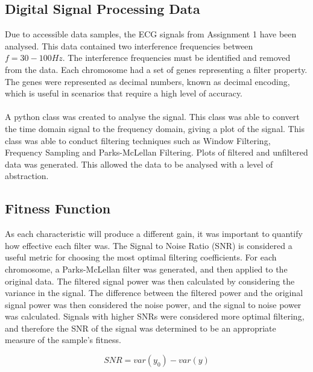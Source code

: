 \documentclass[a4paper, 11pt]{article}
\begin{document}
    \subsection{Digital Signal Processing Data}\label{sec:meth_sub1}
        Due to accessible data samples, the ECG signals from Assignment 1 have been analysed. This data contained
        two interference frequencies between  $f = 30 - 100Hz$. The interference frequencies must be identified and 
        removed from the data. Each chromosome had a set of genes representing a filter property. The genes were 
        represented as decimal numbers, known as decimal encoding, which is useful in scenarios that require a high
        level of accuracy. 
        \\\\
        A python class was created to analyse the signal. This class was able to convert the time domain signal to the
        frequency domain, giving a plot of the signal. This class was able to conduct filtering techniques such as Window
        Filtering, Frequency Sampling and Parks-McLellan Filtering. Plots of filtered and unfiltered data was generated. 
        This allowed the data to be analysed with a level of abstraction.

    \subsection{Fitness Function}\label{sec:meth_sub2}
        As each characteristic will produce a different gain, it was important to quantify how effective each filter was. 
        The Signal to Noise Ratio (SNR) is considered a useful metric for choosing the most optimal filtering coefficients. 
        For each chromosome, a Parks-McLellan filter was generated, and then applied to the original data. The filtered signal
        power was then calculated by considering the variance in the signal. The difference between the filtered power
        and the original signal power was then considered the noise power, and the signal to noise power was calculated. 
        Signals with higher SNRs were considered more optimal filtering, and therefore the SNR of the signal was determined
        to be an appropriate measure of the sample's fitness. 

        \begin{equation} SNR = var(y_{0}) - var(y)\end{equation}
\end{document}
